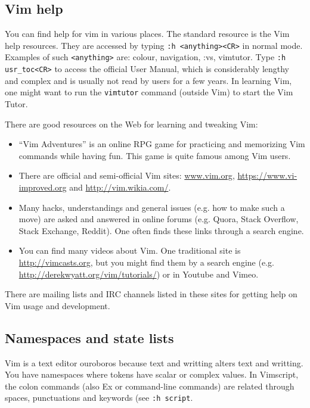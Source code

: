 \documentclass{article}
\begin{document}
\subsection{Vim help}
You can find help for vim in various places.
The standard resource is the Vim help resources.
They are accessed by typing \texttt{:h <anything><CR>}
in normal mode.
Examples of such \texttt{<anything>} are:
colour, navigation, :vs, vimtutor.
Type 
\texttt{:h usr\_toc<CR>}
to access the official User Manual,
which is considerably lengthy and complex
and is usually not read by users for a few years.
In learning Vim, one
might want to run the \texttt{vimtutor} command
(outside Vim) to start the Vim Tutor.

There are good resources on the Web for learning
and tweaking Vim:
\begin{itemize}
  \item ``Vim Adventures'' is an online RPG game for practicing
  and memorizing Vim commands while having fun.
  This game is quite famous among Vim users.
  \item There are official and semi-official Vim sites:
  \url{www.vim.org}, \url{https://www.vi-improved.org} and
  \url{http://vim.wikia.com/}.
  \item Many hacks, understandings and general issues
  (e.g. how to make such a move) are asked and answered
  in online forums (e.g. Quora, Stack Overflow, Stack Exchange, Reddit).
  One often finds these links through a search engine.
  \item You can find many videos about Vim.
  One traditional site is \url{http://vimcasts.org},
  but you might find them by a search engine (e.g. \url{http://derekwyatt.org/vim/tutorials/}) or in Youtube and Vimeo.
\end{itemize}

There are mailing lists and IRC channels listed in these
sites for getting help on Vim usage and development.

\subsection{Namespaces and state lists}
Vim is a text editor ouroboros because
text and writting alters text and writting.
You have namespaces where tokens have scalar
or complex values.
In Vimscript, the colon commands (also Ex or command-line commands) are related through spaces, punctuations and keywords (see \texttt{:h script}.
\end{document}
